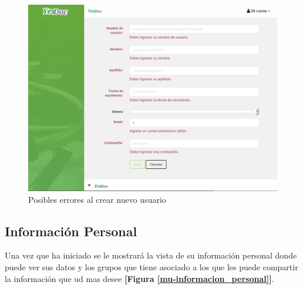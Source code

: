 \documentclass[a4paper,12pt]{article}
\begin{document}
 \begin{figure}
 	\centering
 	\includegraphics[width=.8\textwidth]{img/manual_de_usuario/nuevo_usuario}
 	\caption{Posibles errores al crear nuevo usuario}
 	\label{mu-nuevo_usuario}
 \end{figure}


\subsection{Información Personal} 
Una vez que ha iniciado se le mostrará la vista de su información personal donde puede ver sus datos y los grupos que tiene asociado a los que les puede compartir la información que ud mas desee \textbf{[Figura \ref{mu-informacion_personal}]}. 
\end{document}
